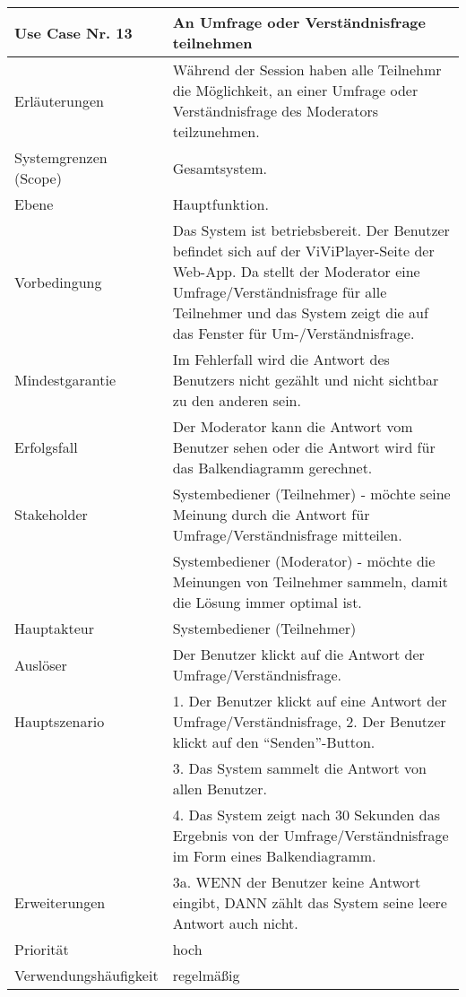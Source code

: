 \begin{tabularx}{\linewidth}{|l|X|}
	\hline
	Use Case Nr. 13			& \textbf{An Umfrage oder Verständnisfrage teilnehmen} \\ \hline
	Erläuterungen			& Während der Session haben alle Teilnehmr die Möglichkeit, an einer 
							  Umfrage oder Verständnisfrage des Moderators teilzunehmen. \\ \hline
	Systemgrenzen (Scope)	& Gesamtsystem. \\ \hline
	Ebene					& Hauptfunktion. \\ \hline
	Vorbedingung			& Das System ist betriebsbereit. Der Benutzer befindet sich auf der 
							  ViViPlayer-Seite der Web-App. Da stellt der Moderator eine Umfrage/Verständnisfrage für alle Teilnehmer und das System zeigt die auf das Fenster für Um-/Verständnisfrage. \\ \hline
	Mindestgarantie			& Im Fehlerfall wird die Antwort des Benutzers nicht gezählt und 
							  nicht sichtbar zu den anderen sein. \\ \hline
	Erfolgsfall				& Der Moderator kann die Antwort vom Benutzer sehen oder die Antwort 
							  wird für das Balkendiagramm gerechnet. \\ \hline
	Stakeholder				& Systembediener (Teilnehmer) - möchte seine Meinung durch die 
							  Antwort für Umfrage/Verständnisfrage mitteilen. \\
							& Systembediener (Moderator) - möchte die Meinungen von Teilnehmer 
							  sammeln, damit die Lösung immer optimal ist. \\ \hline
	Hauptakteur				& Systembediener (Teilnehmer) \\ \hline
	Auslöser				& Der Benutzer klickt auf die Antwort der Umfrage/Verständnisfrage. \\
							  \hline	
	Hauptszenario			& 1. Der Benutzer klickt auf eine Antwort der Umfrage/Verständnisfrage,
	                          2. Der Benutzer klickt auf den ``Senden''-Button. \\
							& 3. Das System sammelt die Antwort von allen Benutzer. \\
							& 4. Das System zeigt nach 30 Sekunden das Ergebnis von der 
							  Umfrage/Verständnisfrage im Form eines Balkendiagramm. \\ \hline
	Erweiterungen			& 3a. WENN der Benutzer keine Antwort eingibt, DANN zählt das System 
							  seine leere Antwort auch nicht. \\ \hline
	Priorität				& hoch \\ \hline
	Verwendungshäufigkeit	& regelmäßig \\ \hline
\end{tabularx}

